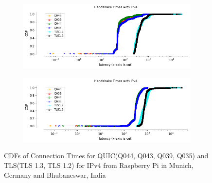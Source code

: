 \begin{frame}
\begin{figure}[!htb]    
    \begin{subfigure}{0.45\textwidth}
        \includegraphics[width=\linewidth]{./plots/PI/handshake_times_ipv4.png}
    \end{subfigure}
%
    \begin{subfigure}{0.45\textwidth}
        \includegraphics[width=\linewidth]{./plots/India/handshake_times_ipv4.png}
    \end{subfigure} 
    \caption{CDFs of Connection Times for QUIC(Q044, Q043, Q039, Q035) and TLS(TLS 1.3, TLS 1.2) for IPv4 from Raspberry Pi in Munich, Germany and Bhubaneswar, India}\label{fig:cdfs-of-connectionm}
\end{figure}
\end{frame}
\clearpage

